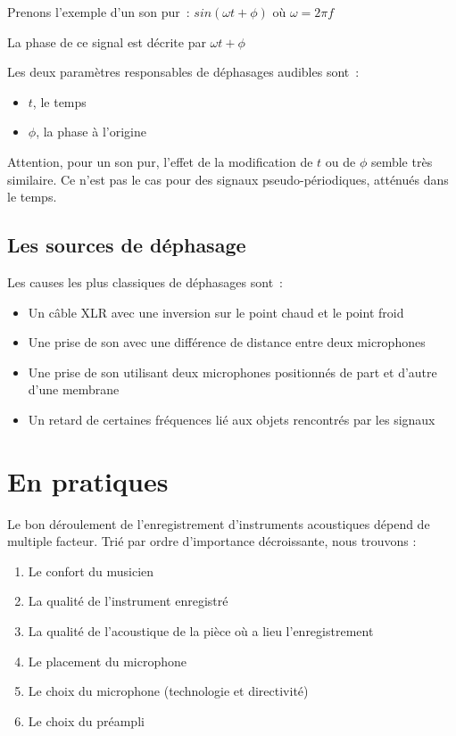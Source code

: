 \documentclass[
  letterpaper,
  DIV=11,
  numbers=noendperiod]{scrreprt}
\providecommand{\tightlist}{%
  \setlength{\itemsep}{0pt}\setlength{\parskip}{0pt}}\usepackage{longtable,booktabs,array}
\begin{document}
Prenons l'exemple d'un son pur~: \(sin (\omega t + \phi)\) où
\(\omega = 2\pi f\)

La phase de ce signal est décrite par \(\omega t +\phi\)

Les deux paramètres responsables de déphasages audibles sont~:

\begin{itemize}
\tightlist
\item
  \(t\), le temps
\item
  \(\phi\), la phase à l'origine
\end{itemize}

Attention, pour un son pur, l'effet de la modification de \(t\) ou de
\(\phi\) semble très similaire. Ce n'est pas le cas pour des signaux
pseudo-périodiques, atténués dans le temps.

\hypertarget{les-sources-de-duxe9phasage}{%
\section{Les sources de déphasage}\label{les-sources-de-duxe9phasage}}

Les causes les plus classiques de déphasages sont~:

\begin{itemize}
\tightlist
\item
  Un câble XLR avec une inversion sur le point chaud et le point froid
\item
  Une prise de son avec une différence de distance entre deux
  microphones
\item
  Une prise de son utilisant deux microphones positionnés de part et
  d'autre d'une membrane
\item
  Un retard de certaines fréquences lié aux objets rencontrés par les
  signaux
\end{itemize}

\hypertarget{en-pratiques}{%
\chapter{En pratiques}\label{en-pratiques}}

Le bon déroulement de l'enregistrement d'instruments acoustiques dépend
de multiple facteur. Trié par ordre d'importance décroissante, nous
trouvons :

\begin{enumerate}
\def\labelenumi{\arabic{enumi}.}
\tightlist
\item
  Le confort du musicien
\item
  La qualité de l'instrument enregistré
\item
  La qualité de l'acoustique de la pièce où a lieu l'enregistrement
\item
  Le placement du microphone
\item
  Le choix du microphone (technologie et directivité)
\item
  Le choix du préampli
\end{enumerate}
\end{document}
